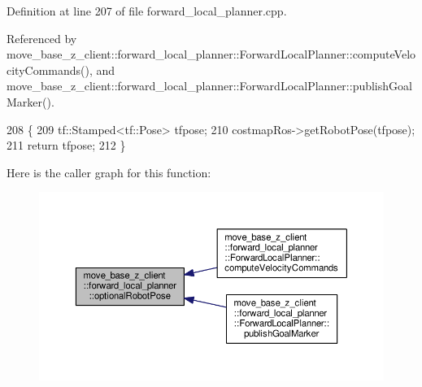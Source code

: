 Definition at line 207 of file forward\+\_\+local\+\_\+planner.\+cpp.



Referenced by move\+\_\+base\+\_\+z\+\_\+client\+::forward\+\_\+local\+\_\+planner\+::\+Forward\+Local\+Planner\+::compute\+Velocity\+Commands(), and move\+\_\+base\+\_\+z\+\_\+client\+::forward\+\_\+local\+\_\+planner\+::\+Forward\+Local\+Planner\+::publish\+Goal\+Marker().


\begin{DoxyCode}
208 \{
209     tf::Stamped<tf::Pose> tfpose;
210     costmapRos->getRobotPose(tfpose);
211     \textcolor{keywordflow}{return} tfpose;
212 \}
\end{DoxyCode}


Here is the caller graph for this function\+:\nopagebreak
\begin{figure}[H]
\begin{center}
\leavevmode
\includegraphics[width=350pt]{namespacemove__base__z__client_1_1forward__local__planner_a683a39a154ed5aa179fdb1afb7bfe2e4_icgraph}
\end{center}
\end{figure}


